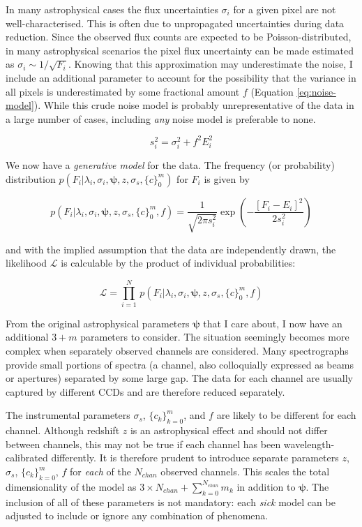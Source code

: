 \documentclass{aastex}
\newcommand{\sick}{\textit{sick}}
\begin{document}
In many astrophysical cases the flux uncertainties $\sigma_{i}$ for a given pixel are not well-characterised. This is often due to unpropagated uncertainties during data reduction. Since the observed flux counts are expected to be Poisson-distributed, in many astrophysical scenarios the pixel flux uncertainty can be made estimated as $\sigma_i \sim 1/\sqrt{F_{i}}$. Knowing that this approximation may underestimate the noise, I include an additional parameter to account for the possibility that the variance in all pixels is underestimated by some fractional amount $f$ (Equation \ref{eq:noise-model}). While this crude noise model is probably unrepresentative of the data in a large number of cases, including \textit{any} noise model is preferable to none.

\begin{equation}
s_{i}^2 = \sigma_{i}^2 + f^{2}E_{i}^2
\label{eq:noise-model}
\end{equation}

We now have a \textit{generative model} for the data. The frequency (or probability) distribution ${p\left(F_i|\lambda_i,\sigma_i,\bm{\psi},z,\sigma_s,\{c\}_{0}^{m}\right)}$ for $F_i$ is given by

\begin{equation}
p\left(F_i|\lambda_i,\sigma_{i},\bm{\psi},z,\sigma_{s},\{c\}_{0}^{m},f\right) = 
 \frac{1}{\sqrt{2\pi{}s_{i}^2}}\exp{\left(-\frac{\left[F_i - E_i\right]^2}{2s_{i}^2}\right)}
 \label{eq:p_model}
\end{equation}

\noindent{}and with the implied assumption that the data are independently drawn, the likelihood $\mathcal{L}$ is calculable by the product of individual probabilities:

\begin{equation}
\mathcal{L} = \prod_{i=1}^{N}\,p\left(F_i|\lambda_i,\sigma_{i},\bm{\psi},z,\sigma_{s},\{c\}_{0}^{m},f\right)
\end{equation}

From the original astrophysical parameters $\bm{\psi}$ that I care about, I now have an additional $3 + m$ parameters to consider. The situation seemingly becomes more complex when separately observed channels are considered. Many spectrographs provide small portions of spectra (a channel, also colloquially expressed as beams or apertures) separated by some large gap. The data for each channel are usually captured by different CCDs and are therefore reduced separately. 

The instrumental parameters $\sigma_{s}$, $\{c_k\}_{k=0}^{m}$, and $f$ are likely to be different for each channel. Although redshift $z$ is an astrophysical effect and should not differ between channels, this may not be true if each channel has been wavelength-calibrated differently. It is therefore prudent to introduce separate parameters $z$, $\sigma_{s}$, $\{c_k\}_{k=0}^{m}$, $f$ for \textit{each} of the $N_{chan}$ observed channels. This scales the total dimensionality of the model as $3\times{}N_{chan} + \sum_{k=0}^{N_{chan}}m_{k}$ in addition to $\bm{\psi}$. The inclusion of all of these parameters is not mandatory: each \sick{} model can be adjusted to include or ignore any combination of phenomena. 
\end{document}
